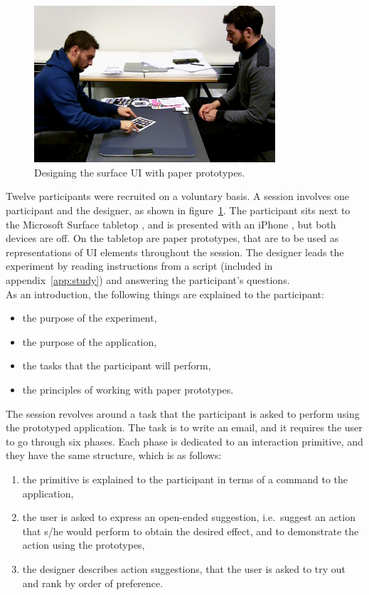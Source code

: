 \begin{figure}[htb]
  \centering
    \includegraphics[width=0.8\textwidth]{images/studyScreenshot}
  \caption{Designing the surface UI with paper prototypes.}
  \label{fig:studyScreenshot}
\end{figure}

Twelve participants were recruited on a voluntary basis.
A session involves one participant and the designer, as shown in figure~\ref{fig:studyScreenshot}.
The participant sits next to the Microsoft Surface tabletop \citep{ms}, and is presented with an iPhone \citep{iphone}, but both devices are off.
On the tabletop are paper prototypes, that are to be used as representations of UI elements throughout the session.
The designer leads the experiment by reading instructions from a script (included in appendix~\ref{app:study}) and answering the participant's questions.
\\
\linebreak
As an introduction, the following things are explained to the participant:
\begin{itemize}
\item the purpose of the experiment,
\item the purpose of the application,
\item the tasks that the participant will perform,
\item the principles of working with paper prototypes.
\end{itemize}
\hfill
\linebreak
The session revolves around a task that the participant is asked to perform using the prototyped application.
The task is to write an email, and it requires the user to go through six phases.
Each phase is dedicated to an interaction primitive, and they have the same structure, which is as follows:
\begin{enumerate}
\item the primitive is explained to the participant in terms of a command to the application,
\item the user is asked to express an open-ended suggestion, i.e.\ suggest an action that s/he would perform to obtain the desired effect, and to demonstrate the action using the prototypes,
\item the designer describes action suggestions, that the user is asked to try out and rank by order of preference.
\end{enumerate}

